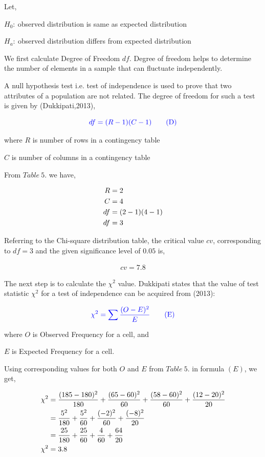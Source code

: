 \documentclass[a4paper]{report}
\begin{document}
Let,

$H_0:\ $observed distribution is same as expected distribution

$H_a:\ $observed distribution differs from expected distribution

We first calculate Degree of Freedom $df$.
Degree of freedom helps to determine the number of elements in a sample that can fluctuate independently.

A null hypothesis test i.e. test of independence is used to prove that two attributes of a population are not related. The degree of freedom for such a test is given by (Dukkipati,2013),  

\begin{equation*}
    \color{blue} df=(R-1)(C-1) \tag{D}
\end{equation*}

where $R$ is number of rows in a contingency table

$C$ is number of columns in a contingency table

From $Table\ 5.$ we have,

\begin{align}
    \notag R&=2 \\ \notag C&=4 \\
    \notag df&=(2-1)(4-1) \\
    df&=3
\end{align}

Referring to the Chi-square distribution table, the critical value $cv$, corresponding to $df=3$ and the given significance level of $0.05$ is,

\begin{align}
    cv=7.8
\end{align}

The next step is to calculate the $\chi ^2$ value. Dukkipati states that the value of test statistic $\chi ^2$ for a test of independence can be acquired from (2013):

\begin{equation*}
    \color{blue} \chi ^2=\sum\frac{(O-E)^2}{E} \tag{E}
\end{equation*}

where $O$ is Observed Frequency for a cell, and

$E$ is Expected Frequency for a cell.

Using corresponding values for both $O$ and $E$ from $Table\ 5.$ in formula $(E)$, we get,

\begin{align}
    \notag \chi ^2&=\frac{(185-180)^2}{180}+\frac{(65-60)^2}{60}+\frac{(58-60)^2}{60}+\frac{(12-20)^2}{20} \\
    \notag &=\frac{5^2}{180}+\frac{5^2}{60}+\frac{(-2)^2}{60}+\frac{(-8)^2}{20} \\
    \notag &=\frac{25}{180}+\frac{25}{60}+\frac{4}{60}+\frac{64}{20}\\
    \chi ^2&=3.8
\end{align}
\end{document}
